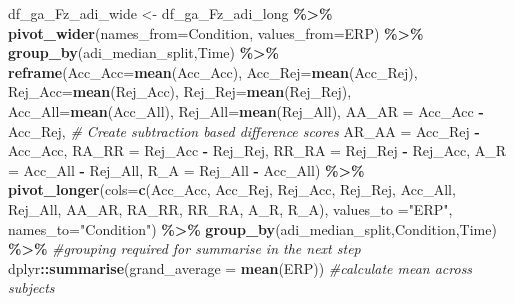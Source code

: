 \documentclass[
]{article}
\newenvironment{Shaded}{\begin{snugshade}}{\end{snugshade}}
\newcommand{\AttributeTok}[1]{\textcolor[rgb]{0.13,0.29,0.53}{#1}}
\newcommand{\CommentTok}[1]{\textcolor[rgb]{0.56,0.35,0.01}{\textit{#1}}}
\newcommand{\FunctionTok}[1]{\textcolor[rgb]{0.13,0.29,0.53}{\textbf{#1}}}
\newcommand{\NormalTok}[1]{#1}
\newcommand{\OtherTok}[1]{\textcolor[rgb]{0.56,0.35,0.01}{#1}}
\newcommand{\SpecialCharTok}[1]{\textcolor[rgb]{0.81,0.36,0.00}{\textbf{#1}}}
\newcommand{\StringTok}[1]{\textcolor[rgb]{0.31,0.60,0.02}{#1}}
\begin{document}
\begin{Shaded}
\begin{Highlighting}[]
\NormalTok{df\_ga\_Fz\_adi\_wide }\OtherTok{\textless{}{-}}\NormalTok{ df\_ga\_Fz\_adi\_long }\SpecialCharTok{\%\textgreater{}\%}
  \FunctionTok{pivot\_wider}\NormalTok{(}\AttributeTok{names\_from=}\NormalTok{Condition, }\AttributeTok{values\_from=}\NormalTok{ERP) }\SpecialCharTok{\%\textgreater{}\%}
  \FunctionTok{group\_by}\NormalTok{(adi\_median\_split,Time) }\SpecialCharTok{\%\textgreater{}\%}
  \FunctionTok{reframe}\NormalTok{(}\AttributeTok{Acc\_Acc=}\FunctionTok{mean}\NormalTok{(Acc\_Acc),}
          \AttributeTok{Acc\_Rej=}\FunctionTok{mean}\NormalTok{(Acc\_Rej),}
          \AttributeTok{Rej\_Acc=}\FunctionTok{mean}\NormalTok{(Rej\_Acc),}
          \AttributeTok{Rej\_Rej=}\FunctionTok{mean}\NormalTok{(Rej\_Rej),}
          \AttributeTok{Acc\_All=}\FunctionTok{mean}\NormalTok{(Acc\_All),}
          \AttributeTok{Rej\_All=}\FunctionTok{mean}\NormalTok{(Rej\_All),}
         \AttributeTok{AA\_AR =}\NormalTok{ Acc\_Acc }\SpecialCharTok{{-}}\NormalTok{ Acc\_Rej, }\CommentTok{\# Create subtraction based difference scores}
         \AttributeTok{AR\_AA =}\NormalTok{ Acc\_Rej }\SpecialCharTok{{-}}\NormalTok{ Acc\_Acc,}
         \AttributeTok{RA\_RR =}\NormalTok{ Rej\_Acc }\SpecialCharTok{{-}}\NormalTok{ Rej\_Rej,}
         \AttributeTok{RR\_RA =}\NormalTok{ Rej\_Rej }\SpecialCharTok{{-}}\NormalTok{ Rej\_Acc,}
         \AttributeTok{A\_R =}\NormalTok{ Acc\_All }\SpecialCharTok{{-}}\NormalTok{ Rej\_All,}
         \AttributeTok{R\_A =}\NormalTok{ Rej\_All }\SpecialCharTok{{-}}\NormalTok{ Acc\_All) }\SpecialCharTok{\%\textgreater{}\%}
  \FunctionTok{pivot\_longer}\NormalTok{(}\AttributeTok{cols=}\FunctionTok{c}\NormalTok{(Acc\_Acc, Acc\_Rej, Rej\_Acc, Rej\_Rej, Acc\_All, Rej\_All, }
\NormalTok{                      AA\_AR, RA\_RR, RR\_RA, A\_R, R\_A), }\AttributeTok{values\_to =}\StringTok{"ERP"}\NormalTok{, }\AttributeTok{names\_to=}\StringTok{"Condition"}\NormalTok{) }\SpecialCharTok{\%\textgreater{}\%}
  \FunctionTok{group\_by}\NormalTok{(adi\_median\_split,Condition,Time) }\SpecialCharTok{\%\textgreater{}\%} \CommentTok{\#grouping required for summarise in the next step}
\NormalTok{  dplyr}\SpecialCharTok{::}\FunctionTok{summarise}\NormalTok{(}\AttributeTok{grand\_average =} \FunctionTok{mean}\NormalTok{(ERP)) }\CommentTok{\#calculate mean across subjects}


\end{Highlighting}
\end{Shaded}
\end{document}
